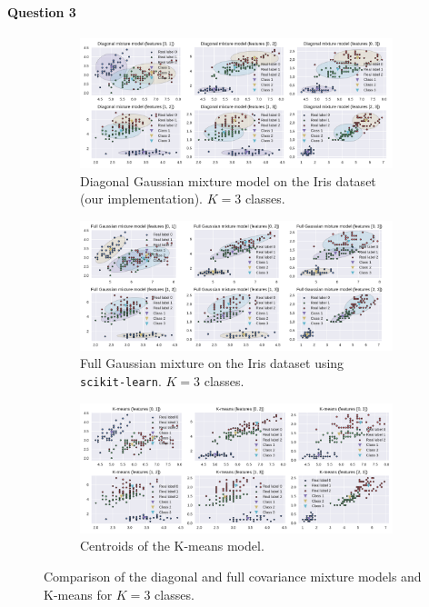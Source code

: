 \documentclass[11pt]{article}
\begin{document}
\paragraph{Question 3}
\begin{figure}
	\centering
	\begin{subfigure}[t]{.95\linewidth}
		\includegraphics[width=\linewidth]{images/diag_em_K3.pdf}
		\caption{Diagonal Gaussian mixture model on the Iris dataset (our implementation). $K=3$ classes.}
	\end{subfigure}
	\begin{subfigure}[t]{.95\linewidth}
		\includegraphics[width=\linewidth]{images/full_em_K3.pdf}
		\caption{Full Gaussian mixture on the Iris dataset using \texttt{scikit-learn}. $K=3$ classes.}
	\end{subfigure}
	\begin{subfigure}[t]{.95\linewidth}
		\includegraphics[width=\linewidth]{images/kmeans_K3.pdf}
		\caption{Centroids of the K-means model.}
	\end{subfigure}
	\caption{Comparison of the diagonal and full covariance mixture models and K-means for $K=3$ classes.}\label{fig:EMdiagfullComparisonK3}
\end{figure}
\end{document}
